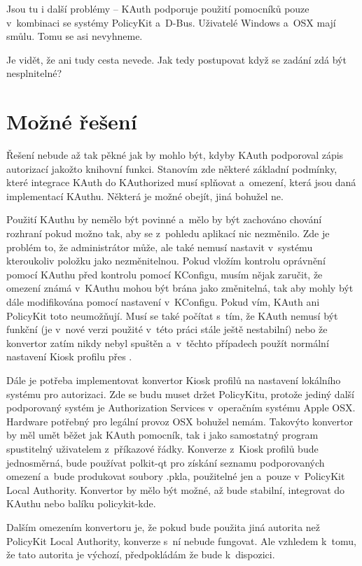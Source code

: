 Jsou tu i další problémy -- KAuth podporuje použití pomocníků pouze v~kombinaci se systémy PolicyKit a~D-Bus. Uživatelé Windows a~OSX mají smůlu. Tomu se asi nevyhneme.

Je vidět, že ani tudy cesta nevede. Jak tedy postupovat když se zadání zdá být nesplnitelné?

\section{Možné řešení}\label{mozres}
Řešení nebude až tak pěkné jak by mohlo být, kdyby KAuth podporoval zápis autorizací jakožto knihovní funkci. Stanovím zde některé základní podmínky, které integrace KAuth do KAuthorized musí splňovat a~omezení, která jsou daná implementací KAuthu. Některá je možné obejít, jiná bohužel ne.

Použití KAuthu by nemělo být povinné a~mělo by být zachováno chování rozhraní  pokud možno tak, aby se z~pohledu aplikací nic nezměnilo. Zde je problém to, že administrátor může, ale také nemusí nastavit v~systému  kteroukoliv položku jako nezměnitelnou. Pokud vložím kontrolu oprávnění pomocí KAuthu před kontrolu pomocí KConfigu, musím nějak zaručit, že omezení známá v~KAuthu mohou být brána jako změnitelná, tak aby mohly být dále modifikována pomocí nastavení v~KConfigu. Pokud vím, KAuth ani PolicyKit toto neumožňují. Musí se také počítat s~tím, že KAuth nemusí být funkční (je v~nové verzi použité v~této práci stále ještě nestabilní) nebo že konvertor zatím nikdy nebyl spuštěn a~v~těchto případech použít normální nastavení Kiosk profilu přes .

Dále je potřeba implementovat konvertor Kiosk profilů na nastavení lokálního systému pro autorizaci. Zde se budu muset držet PolicyKitu, protože jediný další podporovaný systém je Authorization Services v~operačním systému Apple OSX. Hardware potřebný pro legální provoz OSX bohužel nemám. Takovýto konvertor by měl umět běžet jak KAuth pomocník, tak i jako samostatný program spustitelný uživatelem z~příkazové řádky. Konverze z~Kiosk profilů bude jednosměrná, bude používat polkit-qt pro získání seznamu podporovaných omezení a~bude produkovat soubory .pkla, použitelné jen a~pouze v~PolicyKit Local Authority. Konvertor by mělo být možné, až bude stabilní, integrovat do KAuthu nebo balíku policykit-kde.

Dalším omezením konvertoru je, že pokud bude použita jiná autorita než PolicyKit Local Authority, konverze s~ní nebude fungovat. Ale vzhledem k~tomu, že tato autorita je výchozí, předpokládám že bude k~dispozici.

